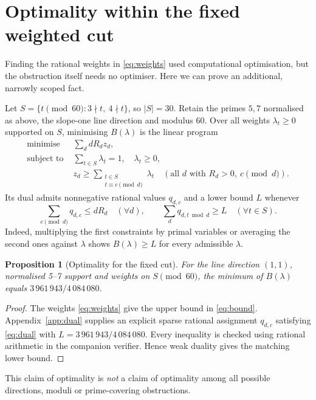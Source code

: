 \documentclass[11pt,a4paper]{article}
\newtheorem{proposition}{Proposition}
\begin{document}
\section{Optimality within the fixed weighted cut}\label{sec:opt}
Finding the rational weights in \eqref{eq:weights} used computational optimisation, but the obstruction itself needs no optimiser. Here we can prove an additional, narrowly scoped fact.

Let $S=\{t\pmod{60}:3\nmid t,\ 4\nmid t\}$, so $|S|=30$. Retain the primes $5,7$ normalised as above, the slope-one line direction and modulus $60$. Over all weights $\lambda_t\ge0$ supported on $S$, minimising $B(\lambda)$ is the linear program
\begin{align}\label{eq:lp}
 \text{minimise }&\sum_d dR_d z_d,\\[-2pt]
 \text{subject to }&\sum_{t\in S}\lambda_t=1,\quad\lambda_t\ge0,\nonumber\\
 &z_d\ge\sum_{\substack{t\in S\\t\equiv c\pmod d}}\lambda_t
 \quad(\text{all }d\text{ with }R_d>0,\ c\pmod d).\nonumber
\end{align}
Its dual admits nonnegative rational values $q_{d,c}$ and a lower bound $L$ whenever
\begin{equation}\label{eq:dual}
 \sum_{c\pmod d}q_{d,c}\le dR_d\quad(\forall d),
 \qquad\sum_d q_{d,t\bmod d}\ge L\quad(\forall t\in S).
\end{equation}
Indeed, multiplying the first constraints by primal variables or averaging the second ones against $\lambda$ shows $B(\lambda)\ge L$ for every admissible $\lambda$.

\begin{proposition}[Optimality for the fixed cut]\label{prop:opt}
For the line direction $(1,1)$, normalised 5--7 support and weights on $S\pmod{60}$, the minimum of $B(\lambda)$ equals $3\,961\,943/4\,084\,080$.
\end{proposition}
\begin{proof}
The weights \eqref{eq:weights} give the upper bound in \eqref{eq:bound}. Appendix~\ref{app:dual} supplies an explicit sparse rational assignment $q_{d,c}$ satisfying \eqref{eq:dual} with $L=3\,961\,943/4\,084\,080$. Every inequality is checked using rational arithmetic in the companion verifier. Hence weak duality gives the matching lower bound.
\end{proof}
This claim of optimality is \emph{not} a claim of optimality among all possible directions, moduli or prime-covering obstructions.
\end{document}
